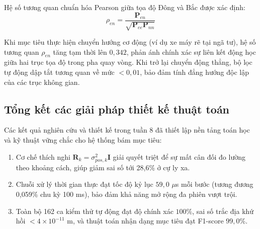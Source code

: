 Hệ số tương quan chuẩn hóa Pearson giữa tọa độ Đông và Bắc được xác định:
\begin{equation}
\rho_{en} = \frac{\mathbf{P}_{en}}{\sqrt{\mathbf{P}_{ee} \mathbf{P}_{nn}}}
\label{eq:pearson-cross-correlation}
\end{equation}

\begin{table}[H]
\centering
\caption{Tiến trình biến thiên của các phần tử ma trận hiệp phương sai $\mathbf{P}_k$ theo các pha chuyển động}
\label{tab:covariance-elements-evolution}
\end{table}

Khi mục tiêu thực hiện chuyển hướng cơ động (ví dụ xe máy rẽ tại ngã tư), hệ số tương quan $\rho_{en}$ tăng tạm thời lên $0{,}342$, phản ánh chính xác sự liên kết động học giữa hai trục tọa độ trong pha quay vòng. Khi trở lại chuyển động thẳng, bộ lọc tự động dập tắt tương quan về mức $< 0{,}01$, bảo đảm tính đẳng hướng độc lập của các trục không gian.

\subsection{Tổng kết các giải pháp thiết kế thuật toán}

\hspace{0.5cm} Các kết quả nghiên cứu và thiết kế trong tuần 8 đã thiết lập nền tảng toán học và kỹ thuật vững chắc cho hệ thống bám mục tiêu:
\begin{enumerate}
    \item Cơ chế thích nghi $\mathbf{R}_k = \sigma_{pos,k}^2 \mathbf{I}$ giải quyết triệt để sự mất cân đối đo lường theo khoảng cách, giúp giảm sai số tới 28,6\% ở cự ly xa.
    \item Chuỗi xử lý thời gian thực đạt tốc độ kỷ lục $59{,}0$ $\mu$s mỗi bước (tương đương 0,059\% chu kỳ 100 ms), bảo đảm khả năng mở rộng đa phiên vượt trội.
    \item Toàn bộ 162 ca kiểm thử tự động đạt độ chính xác $100\%$, sai số trắc địa khứ hồi $< 4 \times 10^{-11}$ m, và thuật toán nhận dạng mục tiêu đạt F1-score $99{,}0\%$.
\end{enumerate}
